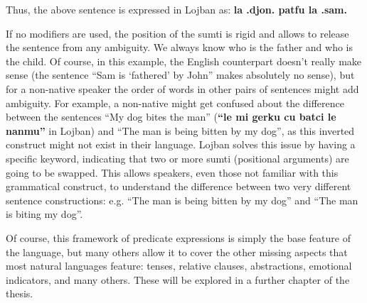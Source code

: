 Thus, the above sentence is expressed in Lojban as: \textbf{la .djon. patfu la .sam.} \newline

If no modifiers are used, the position of the sumti is rigid and allows to release the sentence from any ambiguity. We always know who is the father and who is the child.
Of course, in this example, the English counterpart doesn't really make sense (the sentence ``Sam is `fathered' by John'' makes absolutely no sense), but for a non-native speaker
the order of words in other pairs of sentences might add ambiguity. For example, a non-native might get confused about the difference between the sentences
``My dog bites the man'' (\textbf{``le mi gerku cu batci le nanmu''} in Lojban) and ``The man is being bitten by my dog'', as this inverted construct might not exist in their language.
Lojban solves this issue by having a specific keyword, indicating that two or more sumti (positional arguments) are going to be swapped. This allows speakers, even those not
familiar with this grammatical construct, to understand the difference between two very different sentence constructions: e.g. ``The man is being bitten by my dog''
and ``The man is biting my dog''.\newline

Of course, this framework of predicate expressions is simply the base feature of the language, but many others allow it to cover the other missing aspects that most natural
languages feature: tenses, relative clauses, abstractions, emotional indicators, and many others. These will be explored in a further chapter of the thesis. \newline